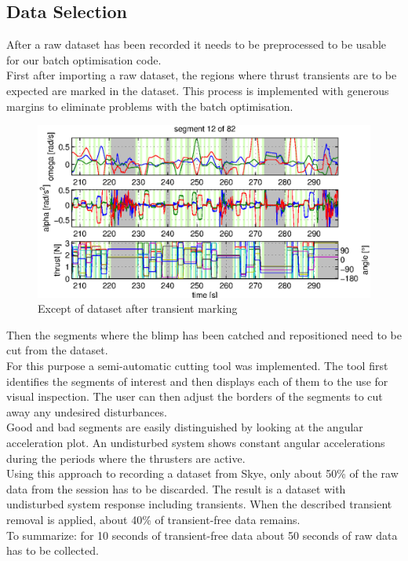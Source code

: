 \subsection{Data Selection}
\label{sub:data_selection}
After a raw dataset has been recorded it needs to be preprocessed to be usable for our batch optimisation code.\\
First after importing a raw dataset, the regions where thrust transients are to be expected are marked in the dataset.
This process is implemented with generous margins to eliminate problems with the batch optimisation. \\
\begin{figure}[htbp]
\centering
\includegraphics[scale=0.8]{images/interactive_cut/interactive_cut_long_modified.eps}
\caption{Except of dataset after transient marking}
\end{figure}
Then the segments where the blimp has been catched and repositioned need to be cut from the dataset. \\
For this purpose a semi-automatic cutting tool was implemented. 
The tool first identifies the segments of interest and then displays each of them to the use for visual inspection.
The user can then adjust the borders of the segments to cut away any undesired disturbances. \\
Good and bad segments are easily distinguished by looking at the angular acceleration plot.
An undisturbed system shows constant angular accelerations during the periods where the thrusters are active. \\
Using this approach to recording a dataset from Skye, only about 50\% of the raw data from the session has to be discarded.
The result is a dataset with undisturbed system response including transients.
When the described transient removal is applied, about 40\% of transient-free data remains.\\
To summarize: for 10 seconds of transient-free data about 50 seconds of raw data has to be collected.

